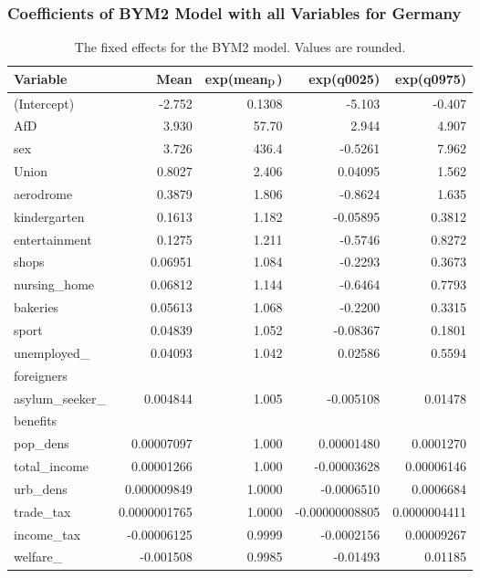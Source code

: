 \subsubsection{Coefficients of BYM2 Model with all Variables for Germany}
\begin{table}[H] 
\caption{The fixed effects for the BYM2 model. Values are rounded. \label{allGermanyBYM2}}
\begin{tabular}{l r r r r}
\toprule
\textbf{Variable}	& \textbf{Mean}	& \textbf{exp(mean$_{\hbox{p}}$)} & \textbf{exp(q0025)} & \textbf{exp(q0975)} \\
\midrule
(Intercept) & -2.752 & 0.1308 & -5.103  & -0.407\\
AfD & 3.930 & 57.70  & 2.944 & 4.907 \\
sex & 3.726 & 436.4 & -0.5261 & 7.962 \\
Union & 0.8027 & 2.406 & 0.04095 & 1.562 \\
aerodrome & 0.3879 & 1.806 & -0.8624 & 1.635 \\
kindergarten & 0.1613 & 1.182 & -0.05895 & 0.3812 \\
entertainment & 0.1275 & 1.211 & -0.5746 & 0.8272 \\
shops & 0.06951 & 1.084 &  -0.2293 & 0.3673 \\
nursing\_home & 0.06812 & 1.144 & -0.6464 & 0.7793 \\
bakeries & 0.05613 & 1.068 & -0.2200 & 0.3315 \\
sport & 0.04839 & 1.052 &  -0.08367 & 0.1801 \\
unemployed\_ & \multirow{2}{*}{0.04093} & \multirow{2}{*}{1.042}  & \multirow{2}{*}{0.02586} & \multirow{2}{*}{0.5594}\\
foreigners  \\
asylum\_seeker\_ & \multirow{2}{*}{0.004844} & \multirow{2}{*}{1.005}  & \multirow{2}{*}{-0.005108} & \multirow{2}{*}{0.01478}\\
benefits  \\
pop\_dens & 0.00007097 & 1.000 & 0.00001480 & 0.0001270 \\
total\_income & 0.00001266 & 1.000 & -0.00003628 & 0.00006146 \\
urb\_dens & 0.000009849  & 1.0000 & -0.0006510 & 0.0006684 \\
trade\_tax &  0.0000001765 & 1.0000 & -0.00000008805 & 0.0000004411 \\
income\_tax &  -0.00006125 & 0.9999 &  -0.0002156 & 0.00009267 \\
welfare\_ & \multirow{2}{*}{-0.001508} & \multirow{2}{*}{0.9985}  & \multirow{2}{*}{-0.01493} & \multirow{2}{*}{0.01185}\\

\end{tabular}
\end{table}
